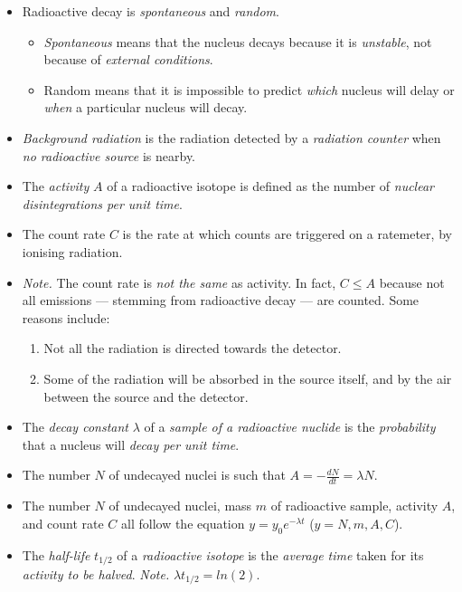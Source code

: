 \documentclass[oneside]{book}
\begin{document}
\begin{itemize}
    \item[\AsteriskThin] Radioactive decay is \emph{spontaneous} and \emph{random}.
    \begin{itemize}
        \item \emph{Spontaneous} means that the nucleus decays because it is \emph{unstable}, not because of \emph{external conditions}.
        \item Random means that it is impossible to predict \emph{which} nucleus will delay or \emph{when} a particular nucleus will decay.
    \end{itemize}
    \item[\AsteriskThin] \emph{Background radiation} is the radiation detected by a \emph{radiation counter} when \emph{no radioactive source} is nearby.
    \item[\AsteriskThin] The \emph{activity} \(A\) of a radioactive isotope is defined as the number of \emph{nuclear disintegrations per unit time}.
    \item The count rate \(C\) is the rate at which counts are triggered on a ratemeter, by ionising radiation. 
    \item \emph{Note.} The count rate is \emph{not the same} as activity. In fact, \(C\leq A\) because not all emissions --- stemming from radioactive decay --- are counted. Some reasons include:
    \begin{enumerate}
        \item Not all the radiation is directed towards the detector.
        \item Some of the radiation will be absorbed in the source itself, and by the air between the source and the detector. 
    \end{enumerate}
    \item[\AsteriskThin] The \emph{decay constant} \(\lambda\) of a \emph{sample of a radioactive nuclide} is the \emph{probability} that a nucleus will \emph{decay per unit time}. 
    \item The number \(N\) of undecayed nuclei is such that \(A=-\frac{dN}{dt}=\lambda N\).
    \item The number \(N\) of undecayed nuclei, mass \(m\) of radioactive sample, activity \(A\), and count rate \(C\) all follow the equation \(y=y_0e^{-\lambda t}\) (\(y=N,m,A,C\)).
    \item[\AsteriskThin] The \emph{half-life} \(t_{1/2}\) of a \emph{radioactive isotope} is the \emph{average time} taken for its \emph{activity to be halved}. \emph{Note.} \(\lambda t_{1/2}=ln(2)\).

\end{itemize}
\end{document}
